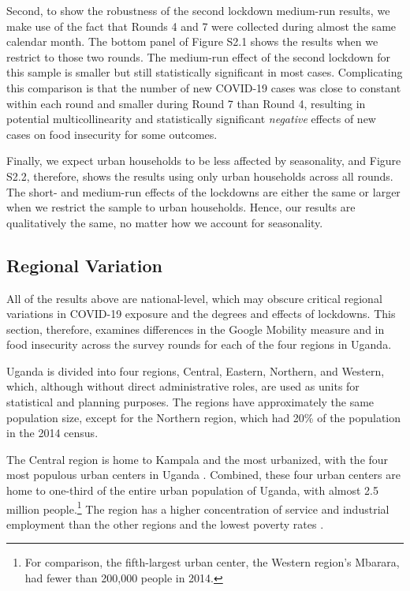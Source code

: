 \documentclass{wber}
\begin{document}
Second, to show the robustness of the second lockdown medium-run
results, we make use of the fact that Rounds 4 and 7 were collected
during almost the same calendar month. The bottom panel of 
Figure S2.1 shows the results when we restrict
to those two rounds. The medium-run effect of the second lockdown for
this sample is smaller but still statistically significant in most
cases. Complicating this comparison is that the number of new COVID-19
cases was close to constant within each round and smaller during Round 7
than Round 4, resulting in potential multicollinearity and statistically
significant \emph{negative} effects of new cases on food insecurity for
some outcomes.

Finally, we expect urban households to be less affected by seasonality,
and Figure S2.2, therefore, shows the
results using only urban households across all rounds. The short- and
medium-run effects of the lockdowns are either the same or larger when
we restrict the sample to urban households. Hence, our results are
qualitatively the same, no matter how we account for seasonality.

\subsection{Regional Variation}\label{regional-variation}

All of the results above are national-level, which may obscure critical
regional variations in COVID-19 exposure and the degrees and effects of
lockdowns. This section, therefore, examines differences in the Google
Mobility measure and in food insecurity across the survey rounds for
each of the four regions in Uganda.

Uganda is divided into four regions, Central, Eastern, Northern, and
Western, which, although without direct administrative roles, are used
as units for statistical and planning purposes. The regions have
approximately the same population size, except for the Northern region,
which had 20\% of the population in the 2014 census.

The Central region is home to Kampala and the most urbanized, with the
four most populous urban centers in Uganda
\citep{Uganda-Bureau-of-Statistics2016}. Combined, these four urban
centers are home to one-third of the entire urban population of Uganda,
with almost 2.5 million people.\footnote{For comparison, the
  fifth-largest urban center, the Western region's Mbarara, had fewer
  than 200,000 people in 2014.} The region has a higher concentration of
service and industrial employment than the other regions and the lowest
poverty rates \citep{Ssewanyana2012}.
\end{document}
